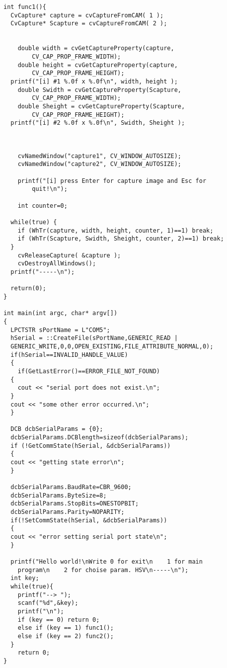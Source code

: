 \begin{lstlisting}
int func1(){
  CvCapture* capture = cvCaptureFromCAM( 1 );
  CvCapture* Scapture = cvCaptureFromCAM( 2 );
    

    double width = cvGetCaptureProperty(capture, 
    	CV_CAP_PROP_FRAME_WIDTH);
    double height = cvGetCaptureProperty(capture, 
    	CV_CAP_PROP_FRAME_HEIGHT);
  printf("[i] #1 %.0f x %.0f\n", width, height );
    double Swidth = cvGetCaptureProperty(Scapture, 
    	CV_CAP_PROP_FRAME_WIDTH);
    double Sheight = cvGetCaptureProperty(Scapture, 
    	CV_CAP_PROP_FRAME_HEIGHT);
  printf("[i] #2 %.0f x %.0f\n", Swidth, Sheight );

    
  
    cvNamedWindow("capture1", CV_WINDOW_AUTOSIZE);
    cvNamedWindow("capture2", CV_WINDOW_AUTOSIZE);

    printf("[i] press Enter for capture image and Esc for 
    	quit!\n");

    int counter=0;

  while(true) {
    if (WhTr(capture, width, height, counter, 1)==1) break;
    if (WhTr(Scapture, Swidth, Sheight, counter, 2)==1) break;
  }
    cvReleaseCapture( &capture );  
    cvDestroyAllWindows();
  printf("-----\n");

  return(0);
}

int main(int argc, char* argv[])
{
  LPCTSTR sPortName = L"COM5";
  hSerial = ::CreateFile(sPortName,GENERIC_READ | 
  GENERIC_WRITE,0,0,OPEN_EXISTING,FILE_ATTRIBUTE_NORMAL,0);
  if(hSerial==INVALID_HANDLE_VALUE)
  {
    if(GetLastError()==ERROR_FILE_NOT_FOUND)
  {
    cout << "serial port does not exist.\n";
  }
  cout << "some other error occurred.\n";
  }
  
  DCB dcbSerialParams = {0};
  dcbSerialParams.DCBlength=sizeof(dcbSerialParams);
  if (!GetCommState(hSerial, &dcbSerialParams))
  {
  cout << "getting state error\n";
  }
  
  dcbSerialParams.BaudRate=CBR_9600;
  dcbSerialParams.ByteSize=8;
  dcbSerialParams.StopBits=ONESTOPBIT;
  dcbSerialParams.Parity=NOPARITY;
  if(!SetCommState(hSerial, &dcbSerialParams))
  {
  cout << "error setting serial port state\n";
  }

  printf("Hello world!\nWrite 0 for exit\n    1 for main 
  	program\n    2 for choise param. HSV\n-----\n");
  int key;
  while(true){
    printf("--> ");
    scanf("%d",&key);
    printf("\n");
    if (key == 0) return 0;
    else if (key == 1) func1();
    else if (key == 2) func2();
  }
    return 0;
}

\end{lstlisting}